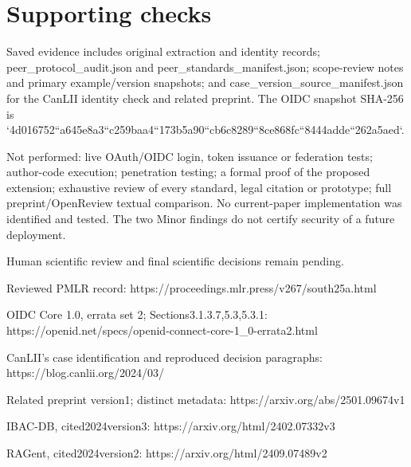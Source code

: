 \documentclass[10pt]{article}
\begin{document}
\section*{Supporting checks}
Saved evidence includes original extraction and identity records; peer\_protocol\_audit.json and peer\_standards\_manifest.json; scope-review notes and primary example/version snapshots; and case\_version\_source\_manifest.json for the CanLII identity check and related preprint. The OIDC snapshot SHA-256 is `4d016752``a645e8a3``c259baa4``173b5a90``cb6c8289``8ce868fc``8444adde``262a5aed`.\par
Not performed: live OAuth/OIDC login, token issuance or federation tests; author-code execution; penetration testing; a formal proof of the proposed extension; exhaustive review of every standard, legal citation or prototype; full preprint/OpenReview textual comparison. No current-paper implementation was identified and tested. The two Minor findings do not certify security of a future deployment.\par
Human scientific review and final scientific decisions remain pending.\par
Reviewed PMLR record: https://proceedings.mlr.press/v267/south25a.html\par
OIDC Core 1.0, errata set 2; Sections3.1.3.7,5.3,5.3.1: https://openid.net/specs/openid-connect-core-1\_0-errata2.html\par
CanLII’s case identification and reproduced decision paragraphs: https://blog.canlii.org/2024/03/\par
Related preprint version1; distinct metadata: https://arxiv.org/abs/2501.09674v1\par
IBAC-DB, cited2024version3: https://arxiv.org/html/2402.07332v3\par
RAGent, cited2024version2: https://arxiv.org/html/2409.07489v2\par
\end{document}

